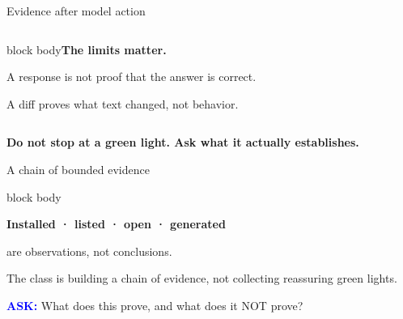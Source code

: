 \documentclass[aspectratio=169,11pt]{beamer}
\begin{document}
\begin{frame}{Evidence after model action}\begin{columns}[T]\begin{beamercolorbox}[sep=.7em,wd=\linewidth]{block body}\textbf{The limits matter.}\par\vspace{.25cm}A response is not proof that the answer is correct.\par\vspace{.25cm}A diff proves what text changed, not behavior.\end{beamercolorbox}\end{columns}\vfill\textcolor{gold!80!black}{\textbf{Do not stop at a green light. Ask what it actually establishes.}}\end{frame}
\begin{frame}{A chain of bounded evidence}\centering{}\par\vspace{.7cm}\begin{beamercolorbox}[wd=.9\paperwidth,sep=.8em]{block body}\centering\parbox{.82\paperwidth}{\centering\Large\textbf{Installed · listed · open · generated}\par\normalsize are observations, not conclusions.\par\vspace{.25cm}\normalsize The class is building a chain of evidence, not collecting reassuring green lights.}\end{beamercolorbox}\vfill\textcolor{blue}{\textbf{ASK:}} What does this prove, and what does it NOT prove?\end{frame}
\end{document}
